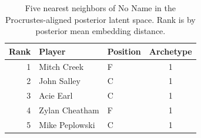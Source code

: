 \begin{table}[htbp]
  \centering\small
  \begin{tabular}{rllc}
    \toprule
    Rank & Player & Position & Archetype \\
    \midrule
    1 & Mitch Creek & F & 1 \\
    2 & John Salley & C & 1 \\
    3 & Acie Earl & C & 1 \\
    4 & Zylan Cheatham & F & 1 \\
    5 & Mike Peplowski & C & 1 \\
    \bottomrule
  \end{tabular}
  \caption{Five nearest neighbors of No Name in the Procrustes-aligned posterior latent space. Rank is by posterior mean embedding distance.}
  \label{tab:No_Name_neighbors}
\end{table}

